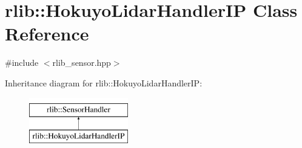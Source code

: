 \hypertarget{classrlib_1_1HokuyoLidarHandlerIP}{\section{rlib\-:\-:Hokuyo\-Lidar\-Handler\-I\-P Class Reference}
\label{classrlib_1_1HokuyoLidarHandlerIP}
}


{\ttfamily \#include $<$rlib\-\_\-sensor.\-hpp$>$}

Inheritance diagram for rlib\-:\-:Hokuyo\-Lidar\-Handler\-I\-P\-:\begin{figure}[H]
\begin{center}
\leavevmode
\includegraphics[height=2.000000cm]{classrlib_1_1HokuyoLidarHandlerIP}
\end{center}
\end{figure}
